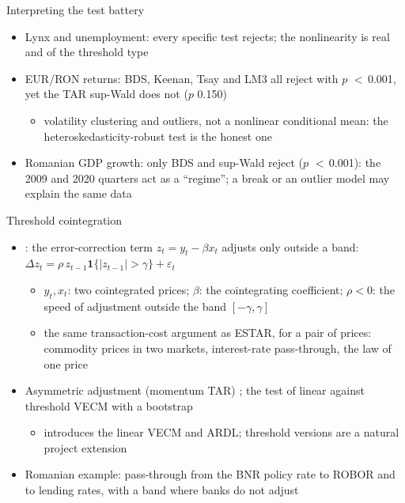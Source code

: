 \begin{frame}{Interpreting the test battery}
\itemsize{\small}
\begin{itemize}
    \item Lynx and unemployment: every specific test rejects; the nonlinearity is real and of the threshold type
    \item EUR/RON returns: BDS, Keenan, Tsay and LM3 all reject with $p$ $<$\,0.001, yet the TAR sup-Wald does not ($p$ 0.150)
    \begin{itemize}
        \item volatility clustering and outliers, not a nonlinear conditional mean: the heteroskedasticity-robust test is the honest one
    \end{itemize}
    \item Romanian GDP growth: only BDS and sup-Wald reject ($p$ $<$\,0.001): the 2009 and 2020 quarters act as a ``regime''; a break or an outlier model may explain the same data
\end{itemize}
\end{frame}

\begin{frame}{Threshold cointegration}
\itemsize{\small}
\begin{itemize}
    \item {}: the error-correction term $z_t = y_t - \beta x_t$ adjusts only outside a band: $\Delta z_t = \rho\,z_{t-1}\mathbf 1\{|z_{t-1}| > \gamma\} + \varepsilon_t$
    \begin{itemize}
        \item $y_t, x_t$: two cointegrated prices; $\beta$: the cointegrating coefficient; $\rho < 0$: the speed of adjustment outside the band $[-\gamma, \gamma]$
        \item the same transaction-cost argument as ESTAR, for a pair of prices: commodity prices in two markets, interest-rate pass-through, the law of one price
    \end{itemize}
    \item Asymmetric adjustment (momentum TAR) ; the test of linear against threshold VECM with a bootstrap 
    \begin{itemize}
        \item {} introduces the linear VECM and ARDL; threshold versions are a natural project extension
    \end{itemize}
    \item Romanian example: pass-through from the BNR policy rate to ROBOR and to lending rates, with a band where banks do not adjust
\end{itemize}
\end{frame}


